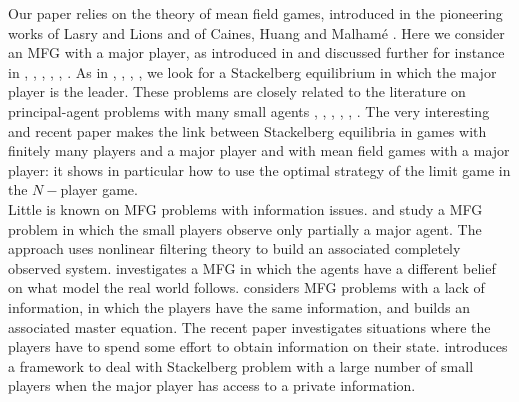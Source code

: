 \documentclass[10pt]{article}
\begin{document}
Our paper relies on the theory of mean field games, introduced in the pioneering works of Lasry and Lions \cite{lasry2006jeux, lasry2006jeuxii, lasry2007mean} and of Caines, Huang and Malham\'e \cite{huang2006large, huang2007large, huang2007invariance}. Here we consider an MFG with a major player, as introduced in \citeauthor{huang2010large} \cite{huang2010large} and discussed further for instance  in \citeauthor{bensoussan2016mean} \cite{bensoussan2016mean}, \citeauthor{bertucci2020strategic} \cite{bertucci2020strategic}, \citeauthor{cardaliaguet2020remarks} \cite{cardaliaguet2020remarks}, \citeauthor{carmona2017alternative} \cite{carmona2017alternative},  \citeauthor{carmona2016probabilistic} \cite{carmona2016probabilistic}, \citeauthor{nourian2013eps} \cite{nourian2013eps}. As in \citeauthor{bensoussan2016mean} \cite{bensoussan2016mean}, \citeauthor{guo2022optimization} \cite{guo2022optimization}, \citeauthor{moon2018linear} \cite{moon2018linear}, \citeauthor{nguyen2012mean} \cite{nguyen2012mean}, we look for a Stackelberg equilibrium in which the major player is the leader. These problems are closely related to  the literature on  principal-agent problems with many small agents \citeauthor{carmona2017alternative} \cite{carmona2017alternative}, \citeauthor{elie2019tale} \cite{elie2019tale}, \citeauthor{elie2019contracting} \cite{elie2019contracting}, \citeauthor{elie2021mean} \cite{elie2021mean}, \citeauthor{hubert2023continuous} \cite{hubert2023continuous}, \citeauthor{nutz2019mean} \cite{nutz2019mean}. The very interesting and recent paper \citeauthor{djete2023stackelberg} \cite{djete2023stackelberg} makes the link between Stackelberg equilibria in games with finitely many players and a major player and with  mean field games with a major player: it shows in particular how to use the optimal strategy of the limit game in the $N-$player game.\\ 

Little is known on MFG problems with information issues.  \citeauthor{sen2016mean} \cite{sen2016mean} and \citeauthor{firoozi2020epsilon} \cite{firoozi2020epsilon} study a MFG problem in which the small players observe only partially a major agent. The approach uses  nonlinear filtering theory to build an associated completely observed system. \citeauthor{casgrain2020mean} \cite{casgrain2020mean} investigates a MFG in which the agents have a different belief on what model the real world follows. \citeauthor{bertucci2022mean} \cite{bertucci2022mean} considers MFG problems with a lack of information, in which the players have the same information, and builds an associated master equation. The recent paper \citeauthor{becherer2023mean} \cite{becherer2023mean} investigates situations where the players have to spend some effort to obtain information on their state. \citeauthor{bergault2024mfg} \cite{bergault2024mfg} introduces a framework to deal with Stackelberg problem with a large number of small players when the major player has access to a private information.\\
\fi
\end{document}

